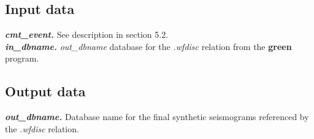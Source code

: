 \subsection {Input data}

\textbf{\large \emph{cmt\_event.}} See description in section 5.2. \\
\textbf{\large \emph{in\_dbname.}} {\it out\_dbname} database for the {\it .wfdisc}
relation from the  {\bf green} program. 
\subsection {Output data}
\textbf{\large \emph{out\_dbname.}} Database name for the final synthetic seismograms
referenced by the {\it .wfdisc} relation.

